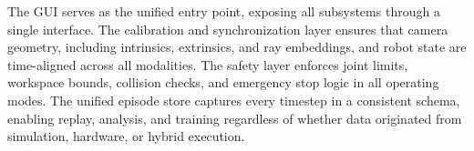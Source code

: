 \documentclass[a4paper, 10pt, conference]{ieeeconf}      %
\begin{document}








The GUI serves as the unified entry point, exposing all subsystems through a single interface. The calibration and synchronization layer ensures that camera geometry, including intrinsics, extrinsics, and ray embeddings, and robot state are time-aligned across all modalities. The safety layer enforces joint limits, workspace bounds, collision checks, and emergency stop logic in all operating modes. The unified episode store captures every timestep in a consistent schema, enabling replay, analysis, and training regardless of whether data originated from simulation, hardware, or hybrid execution. 
\end{document}
